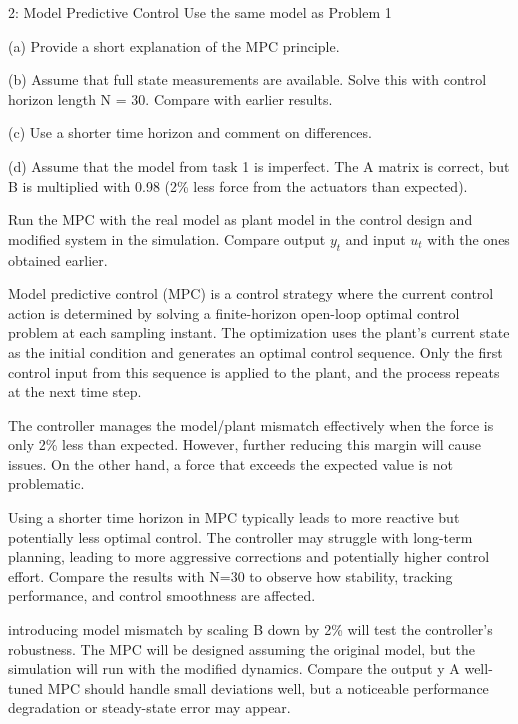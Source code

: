 
\begin{problem}{2: Model Predictive Control}
  Use the same model as Problem 1
  
  \medskip (a) Provide a short explanation of the MPC principle.
  
  \medskip (b) Assume that full state measurements are available. 
  Solve this with control horizon length N = 30. Compare with earlier results.
  
  \medskip (c) Use a shorter time horizon and comment on differences. 
  
  \medskip (d) Assume that the model from task 1 is imperfect. The A matrix is correct, but B is 
  multiplied with 0.98 (2\% less force from the actuators than expected). 
  
  Run the MPC with the real model as plant model in the control design and modified system in the simulation. Compare
  output $y_t$ and input $u_t$ with the ones obtained earlier.

\end{problem}



Model predictive control (MPC) is a control strategy where the current control action is determined by solving a finite-horizon open-loop optimal control problem at each sampling instant. The optimization uses the plant's current state as the initial condition and generates an optimal control sequence. Only the first control input from this sequence is applied to the plant, and the process repeats at the next time step.


The controller manages the model/plant mismatch effectively when the force is only 2\%
less than expected. However, further reducing this margin will cause issues. On the other hand, a force that exceeds the expected value is not problematic.


Using a shorter time horizon in MPC typically leads to more reactive but potentially less optimal control. The controller may struggle with long-term planning, leading to more aggressive corrections and potentially higher control effort. Compare the results with 
N=30 to observe how stability, tracking performance, and control smoothness are affected.


introducing model mismatch by scaling 
B down by 2\% will test the controller's robustness. The MPC will be designed assuming the original model, but the simulation will run with the modified dynamics. Compare the output y
A well-tuned MPC should handle small deviations well, but a noticeable performance degradation or steady-state error may appear.